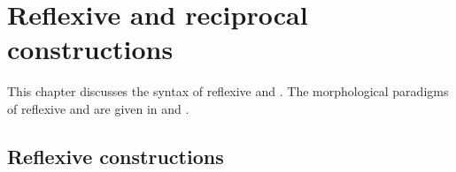\chapter{Reflexive and reciprocal constructions}
\label{cpt:Reflexive and reciprocal constructions}

This chapter discusses the syntax of reflexive and . The morphological paradigms of reflexive and  are given in  and .



\section{Reflexive constructions}
\label{sec:Reflexive constructions}


